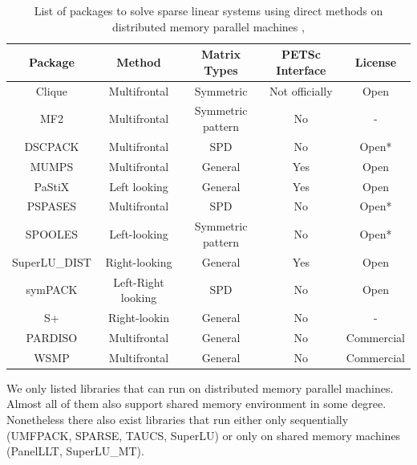 \begin{table}[ht]
\centering
\begin{tabular}{|c|c|c|c|c|}
\hline
Package & Method             & Matrix Types                 & PETSc Interface & License      \\ \hline
Clique       & Multifrontal       & Symmetric      & Not officially  & Open  \\ \hline
MF2          & Multifrontal       & Symmetric pattern & No              & -            \\ \hline
DSCPACK      & Multifrontal       & SPD                          & No              & Open* \\ \hline
MUMPS        & Multifrontal       & General                      & Yes             & Open  \\ \hline
PaStiX       & Left looking & General                      & Yes             & Open  \\ \hline
PSPASES      & Multifrontal       & SPD                          & No              & Open* \\ \hline
SPOOLES      & Left-looking       & Symmetric pattern & No              & Open* \\ \hline
SuperLU\_DIST & Right-looking      & General                      & Yes             & Open  \\ \hline
symPACK      & Left-Right looking & SPD                          & No              & Open  \\ \hline
S+           & Right-lookin       & General                      & No              & -            \\ \hline

PARDISO         & Multifrontal       & General                      & No              & Commercial   \\ \hline

WSMP         & Multifrontal       & General                      & No              & Commercial   \\ \hline
\end{tabular}
\caption{List of packages to solve sparse linear systems using direct methods on distributed memory parallel machines \cite{list-of-sparse-direct-solvers}, \cite{petsc-web-page}}
\label{table:mm-library-spec}
\end{table}


We only listed libraries that can run on distributed memory parallel machines. Almost all of them also support shared memory environment in some degree. Nonetheless there also exist libraries that  run either only sequentially (UMFPACK, SPARSE, TAUCS, SuperLU) or only on shared memory machines (PanelLLT, SuperLU\_MT).\\


